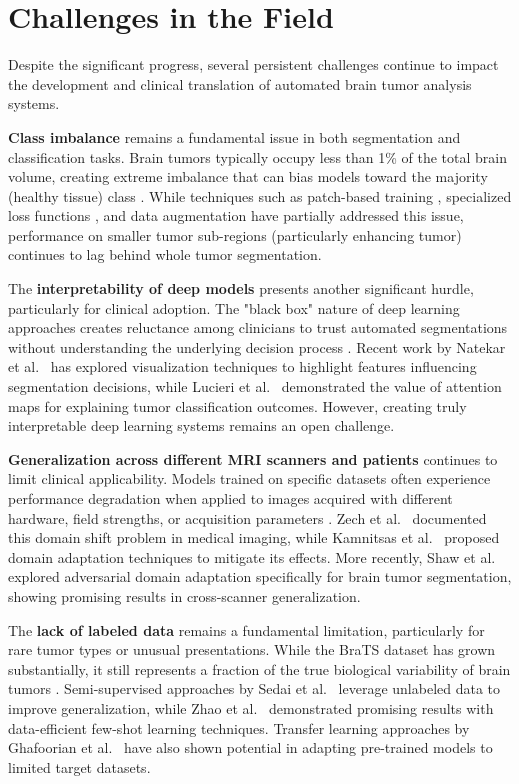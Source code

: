 \section{Challenges in the Field}

Despite the significant progress, several persistent challenges continue to impact the development and clinical translation of automated brain tumor analysis systems.

\textbf{Class imbalance} remains a fundamental issue in both segmentation and classification tasks. Brain tumors typically occupy less than 1\% of the total brain volume, creating extreme imbalance that can bias models toward the majority (healthy tissue) class \cite{Pereira2016}. While techniques such as patch-based training \cite{Havaei2017}, specialized loss functions \cite{Isensee2018}, and data augmentation \cite{Wang2019} have partially addressed this issue, performance on smaller tumor sub-regions (particularly enhancing tumor) continues to lag behind whole tumor segmentation.

The \textbf{interpretability of deep models} presents another significant hurdle, particularly for clinical adoption. The "black box" nature of deep learning approaches creates reluctance among clinicians to trust automated segmentations without understanding the underlying decision process \cite{Holzinger2017}. Recent work by Natekar et al.\ \cite{Natekar2020} has explored visualization techniques to highlight features influencing segmentation decisions, while Lucieri et al.\ \cite{Lucieri2020} demonstrated the value of attention maps for explaining tumor classification outcomes. However, creating truly interpretable deep learning systems remains an open challenge.

\textbf{Generalization across different MRI scanners and patients} continues to limit clinical applicability. Models trained on specific datasets often experience performance degradation when applied to images acquired with different hardware, field strengths, or acquisition parameters \cite{Menze2015}. Zech et al.\ \cite{Zech2018} documented this domain shift problem in medical imaging, while Kamnitsas et al.\ \cite{Kamnitsas2017} proposed domain adaptation techniques to mitigate its effects. More recently, Shaw et al.\ \cite{Shaw2020} explored adversarial domain adaptation specifically for brain tumor segmentation, showing promising results in cross-scanner generalization.

The \textbf{lack of labeled data} remains a fundamental limitation, particularly for rare tumor types or unusual presentations. While the BraTS dataset has grown substantially, it still represents a fraction of the true biological variability of brain tumors \cite{Bakas2019}. Semi-supervised approaches by Sedai et al.\ \cite{Sedai2019} leverage unlabeled data to improve generalization, while Zhao et al.\ \cite{Zhao2019b} demonstrated promising results with data-efficient few-shot learning techniques. Transfer learning approaches by Ghafoorian et al.\ \cite{Ghafoorian2017} have also shown potential in adapting pre-trained models to limited target datasets.

